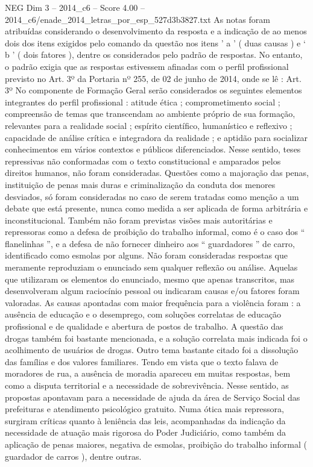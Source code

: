 \begin{textsample}{NEG Dim 3 – 2014\_c6 – Score 4.00 – 2014\_c6/enade\_2014\_letras\_por\_esp\_527d3b3827.txt}
As notas foram atribuídas considerando o desenvolvimento da resposta e a indicação de ao menos dois dos itens exigidos pelo comando da questão nos itens ’ a ’ ( duas causas ) e ‘ b ’ ( dois fatores ), dentre os considerados pelo padrão de respostas.
No entanto, o padrão exigia que as respostas estivessem afinadas com o perfil profissional previsto no Art. 3º da Portaria nº 255, de 02 de junho de 2014, onde se lê : Art. 3º No componente de Formação Geral serão considerados os seguintes elementos integrantes do perfil profissional : atitude ética ; comprometimento social ; compreensão de temas que transcendam ao ambiente próprio de sua formação, relevantes para a realidade social ; espírito científico, humanístico e reflexivo ; capacidade de análise crítica e integradora da realidade ; e aptidão para socializar conhecimentos em vários contextos e públicos diferenciados.
Nesse sentido, teses repressivas não conformadas com o texto constitucional e amparados pelos direitos humanos, não foram consideradas.
Questões como a majoração das penas, instituição de penas mais duras e criminalização da conduta dos menores desviados, só foram consideradas no caso de serem tratadas como menção a um debate que está presente, nunca como medida a ser aplicada de forma arbitrária e inconstitucional.
Também não foram previstas visões mais autoritárias e repressoras como a defesa de proibição do trabalho informal, como é o caso dos “ flanelinhas ”, e a defesa de não fornecer dinheiro aos “ guardadores ” de carro, identificado como esmolas por alguns.
Não foram consideradas respostas que meramente reproduziam o enunciado sem qualquer reflexão ou análise.
Aquelas que utilizaram os elementos do enunciado, mesmo que apenas transcritos, mas desenvolveram algum raciocínio pessoal ou indicaram causas e/ou fatores foram valoradas.
As causas apontadas com maior frequência para a violência foram : a ausência de educação e o desemprego, com soluções correlatas de educação profissional e de qualidade e abertura de postos de trabalho.
A questão das drogas também foi bastante mencionada, e a solução correlata mais indicada foi o acolhimento de usuários de drogas.
Outro tema bastante citado foi a dissolução das famílias e dos valores familiares.
Tendo em vista que o texto falava de moradores de rua, a ausência de moradia apareceu em muitas respostas, bem como a disputa territorial e a necessidade de sobrevivência.
Nesse sentido, as propostas apontavam para a necessidade de ajuda da área de Serviço Social das prefeituras e atendimento psicológico gratuito.
Numa ótica mais repressora, surgiram críticas quanto à leniência das leis, acompanhadas da indicação da necessidade de atuação mais rigorosa do Poder Judiciário, como também da aplicação de penas maiores, negativa de esmolas, proibição do trabalho informal ( guardador de carros ), dentre outras.

\end{textsample}
